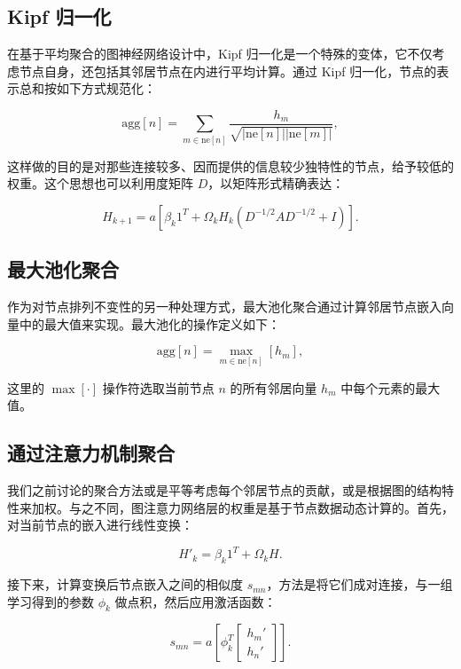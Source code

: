 \documentclass[lang=cn,newtx,10pt,scheme=chinese]{elegantbook}
\begin{document}
\subsection{Kipf 归一化}
在基于平均聚合的图神经网络设计中，Kipf 归一化是一个特殊的变体，它不仅考虑节点自身，还包括其邻居节点在内进行平均计算。通过 Kipf 归一化，节点的表示总和按如下方式规范化：

\begin{equation}
\text{agg}[n] = \sum_{m \in \text{ne}[n]} \frac{h_m}{\sqrt{|\text{ne}[n]||\text{ne}[m]|}}, 
\end{equation}

这样做的目的是对那些连接较多、因而提供的信息较少独特性的节点，给予较低的权重。这个思想也可以利用度矩阵 \(D\)，以矩阵形式精确表达：

\begin{equation}
H_{k+1} = a \left[ \beta_k 1^T + \Omega_k H_k (D^{-1/2} A D^{-1/2} + I) \right]. 
\end{equation}

\subsection{最大池化聚合}
作为对节点排列不变性的另一种处理方式，最大池化聚合通过计算邻居节点嵌入向量中的最大值来实现。最大池化的操作定义如下：

\begin{equation}
\text{agg}[n] = \max_{m \in \text{ne}[n]} \left[ h_m \right], 
\end{equation}

这里的 \(\max[\cdot]\) 操作符选取当前节点 \(n\) 的所有邻居向量 \(h_m\) 中每个元素的最大值。

\subsection{通过注意力机制聚合}

我们之前讨论的聚合方法或是平等考虑每个邻居节点的贡献，或是根据图的结构特性来加权。与之不同，图注意力网络层的权重是基于节点数据动态计算的。首先，对当前节点的嵌入进行线性变换：

\begin{equation}
H'_k = \beta_k 1^T + \Omega_k H. 
\end{equation}

接下来，计算变换后节点嵌入之间的相似度 \(s_{mn}\)，方法是将它们成对连接，与一组学习得到的参数 \(\phi_k\) 做点积，然后应用激活函数：

\begin{equation}
s_{mn} = a \left[ \phi_k^T \left[ \begin{array}{c}
h_m' \\
h_n'
\end{array} \right] \right]. 
\end{equation}
\end{document}
